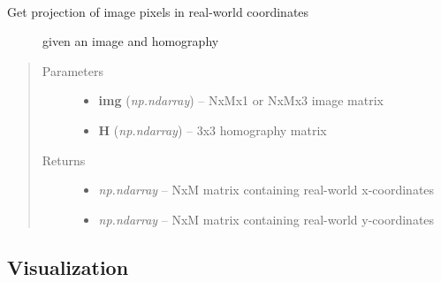 \documentclass[letterpaper,10pt,english]{sphinxmanual}
\begin{document}
\begin{fulllineitems}
\label{flamingo/rectification/index:flamingo.rectification.rectification.rectify_image}~\begin{description}
\item[{Get projection of image pixels in real-world coordinates}] \leavevmode
given an image and homography

\end{description}
\begin{quote}\begin{description}
\item[{Parameters}] \leavevmode\begin{itemize}
\item {} 
\textbf{img} (\emph{np.ndarray}) -- NxMx1 or NxMx3 image matrix

\item {} 
\textbf{H} (\emph{np.ndarray}) -- 3x3 homography matrix

\end{itemize}

\item[{Returns}] \leavevmode
\begin{itemize}
\item {} 
\emph{np.ndarray} --
NxM matrix containing real-world x-coordinates

\item {} 
\emph{np.ndarray} --
NxM matrix containing real-world y-coordinates

\end{itemize}


\end{description}\end{quote}

\end{fulllineitems}



\subsection{Visualization}
\label{flamingo/rectification/index:visualization}\label{flamingo/rectification/index:module-flamingo.rectification.plot}
\end{document}
